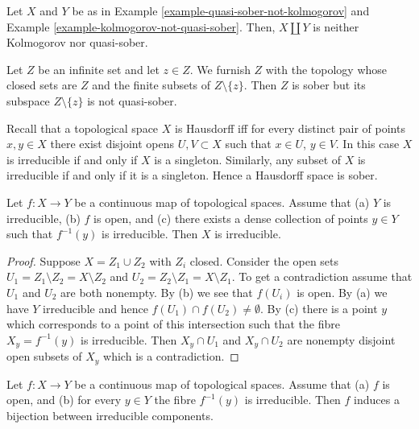 \begin{example}
\label{example-not-kolmogorov-not-quasi-sober}
Let $X$ and $Y$ be as in Example \ref{example-quasi-sober-not-kolmogorov} and
Example \ref{example-kolmogorov-not-quasi-sober}. Then, $X\amalg Y$ is neither
Kolmogorov nor quasi-sober.
\end{example}

\begin{example}
\label{example-sober-subspace}
Let $Z$ be an infinite set and let $z\in Z$. We furnish $Z$ with the topology
whose closed sets are $Z$ and the finite subsets of $Z\setminus\{z\}$. Then $Z$
is sober but its subspace $Z\setminus\{z\}$ is not quasi-sober.
\end{example}

\begin{example}
\label{example-Hausdorff}
Recall that a topological space $X$ is Hausdorff iff for every
distinct pair of points $x, y \in X$ there exist disjoint
opens $U, V \subset X$ such that $x \in U$, $y \in V$.
In this case $X$ is irreducible if and only if $X$ is
a singleton. Similarly, any subset of $X$ is irreducible
if and only if it is a singleton. Hence a Hausdorff space is
sober.
\end{example}

\begin{lemma}
\label{lemma-irreducible-on-top}
Let $f : X \to Y$ be a continuous map of topological spaces.
Assume that
(a) $Y$ is irreducible,
(b) $f$ is open, and
(c) there exists a dense collection of points $y \in Y$ such
that $f^{-1}(y)$ is irreducible.
Then $X$ is irreducible.
\end{lemma}

\begin{proof}
Suppose $X = Z_1 \cup Z_2$ with $Z_i$ closed.
Consider the open sets $U_1 = Z_1 \setminus Z_2 = X \setminus Z_2$ and
$U_2 = Z_2 \setminus Z_1 = X \setminus Z_1$. To get a contradiction
assume that $U_1$ and $U_2$ are both nonempty. By (b) we see that $f(U_i)$
is open. By (a) we have $Y$ irreducible and hence
$f(U_1) \cap f(U_2) \not = \emptyset$. By (c) there is a point $y$ which
corresponds to a point of this intersection such that the fibre
$X_y = f^{-1}(y)$ is irreducible. Then $X_y \cap U_1$ and
$X_y \cap U_2$ are nonempty disjoint open subsets of $X_y$ which is
a contradiction.
\end{proof}

\begin{lemma}
\label{lemma-irreducible-fibres-irreducible-components}
Let $f : X \to Y$ be a continuous map of topological spaces.
Assume that (a) $f$ is open, and
(b) for every $y \in Y$ the fibre $f^{-1}(y)$ is irreducible.
Then $f$ induces a bijection between irreducible components.
\end{lemma}

